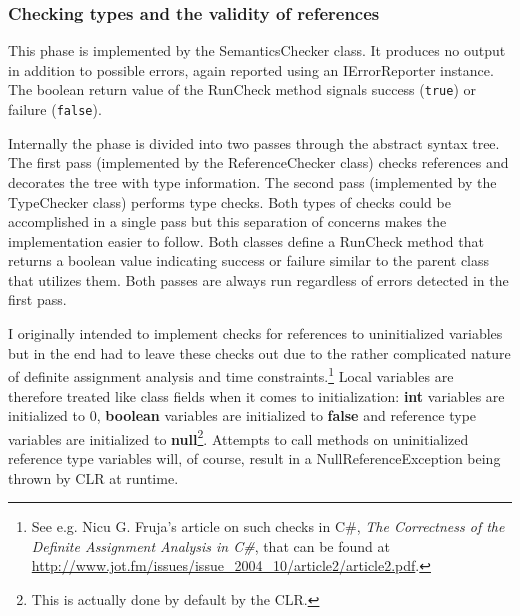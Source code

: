 \documentclass[a4paper,11pt]{article}
\begin{document}
\subsubsection{Checking types and the validity of references}

This phase is implemented by the SemanticsChecker class. It produces no output in addition to possible errors, again reported using an IErrorReporter instance. The boolean return value of the RunCheck method signals success (\verb,true,) or failure (\verb,false,).

Internally the phase is divided into two passes through the abstract syntax tree. The first pass (implemented by the ReferenceChecker class) checks references and decorates the tree with type information. The second pass (implemented by the TypeChecker class) performs type checks. Both types of checks could be accomplished in a single pass but this separation of concerns makes the implementation easier to follow. Both classes define a RunCheck method that returns a boolean value indicating success or failure similar to the parent class that utilizes them. Both passes are always run regardless of errors detected in the first pass.

I originally intended to implement checks for references to uninitialized variables but in the end had to leave these checks out due to the rather complicated nature of definite assignment analysis and time constraints.\footnote{See e.g. Nicu G. Fruja's article on such checks in C\#, \emph{The Correctness of the Definite Assignment Analysis in C\#}, that can be found at \url{http://www.jot.fm/issues/issue_2004_10/article2/article2.pdf}.} Local variables are therefore treated like class fields when it comes to initialization: \textbf{int} variables are initialized to 0, \textbf{boolean} variables are initialized to \textbf{false} and reference type variables are initialized to \textbf{null}\footnote{This is actually done by default by the CLR.}. Attempts to call methods on uninitialized reference type variables will, of course, result in a NullReferenceException being thrown by CLR at runtime.
\end{document}

